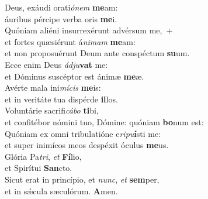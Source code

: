 \evenverse Deus, exáudi orati\textit{ó}\textit{nem} \textbf{me}am:~\*\\
\evenverse áuribus pércipe verba oris \textbf{me}i.\\
\oddverse Quóniam aliéni insurrexérunt advérsum me,~+\\
\oddverse  et fortes quæsiérunt á\textit{ni}\textit{mam} \textbf{me}am:~\*\\
\oddverse et non proposuérunt Deum ante conspéctum \textbf{su}um.\\
\evenverse Ecce enim Deus \textit{ád}\textit{ju}\textbf{vat} me:~\*\\
\evenverse et Dóminus suscéptor est ánimæ \textbf{me}æ.\\
\oddverse Avérte mala ini\textit{mí}\textit{cis} \textbf{me}is:~\*\\
\oddverse et in veritáte tua dispérde \textbf{il}los.\\
\evenverse Voluntárie sacrifi\textit{cá}\textit{bo} \textbf{ti}bi,~\*\\
\evenverse et confitébor nómini tuo, Dómine: quóniam \textbf{bo}num est:\\
\oddverse Quóniam ex omni tribulatióne e\textit{ri}\textit{pu}\textbf{í}sti me:~\*\\
\oddverse et super inimícos meos despéxit óculus \textbf{me}us.\\
\evenverse Glória Pa\textit{tri}, \textit{et} \textbf{Fí}lio,~\*\\
\evenverse et Spirítui \textbf{San}cto.\\
\oddverse Sicut erat in princípio, et \textit{nunc}, \textit{et} \textbf{sem}per,~\*\\
\oddverse et in sǽcula sæculórum. \textbf{A}men.\\
